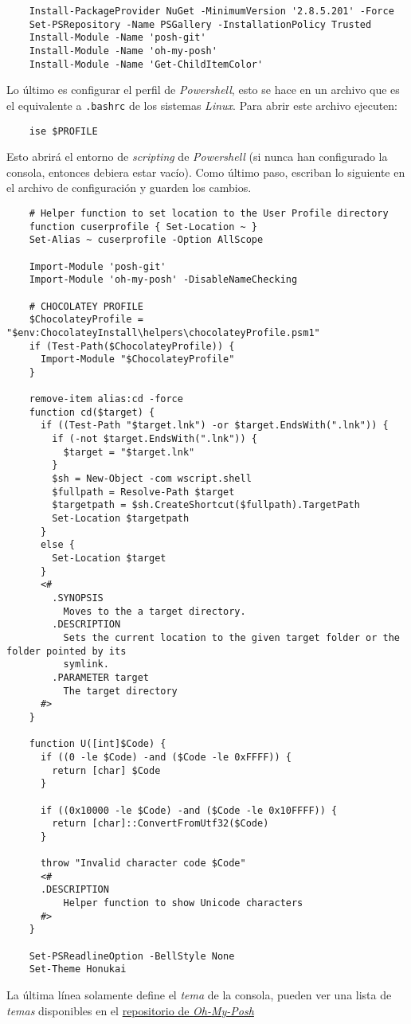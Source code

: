   \begin{verbatim}
    Install-PackageProvider NuGet -MinimumVersion '2.8.5.201' -Force
    Set-PSRepository -Name PSGallery -InstallationPolicy Trusted
    Install-Module -Name 'posh-git'
    Install-Module -Name 'oh-my-posh'
    Install-Module -Name 'Get-ChildItemColor'
  \end{verbatim}

  Lo último es configurar el perfil de \textit{Powershell}, esto se hace en un archivo que
  es el equivalente a \texttt{.bashrc} de los sistemas \textit{Linux}.
  Para abrir este archivo ejecuten:

  \begin{verbatim}
    ise $PROFILE
  \end{verbatim}

  Esto abrirá el entorno de \textit{scripting} de \textit{Powershell} (si nunca han 
  configurado la consola, entonces debiera estar vacío).
  Como último paso, escriban lo siguiente en el archivo de configuración y guarden los 
  cambios.

  \begin{verbatim}
    # Helper function to set location to the User Profile directory
    function cuserprofile { Set-Location ~ }
    Set-Alias ~ cuserprofile -Option AllScope

    Import-Module 'posh-git'
    Import-Module 'oh-my-posh' -DisableNameChecking

    # CHOCOLATEY PROFILE
    $ChocolateyProfile = "$env:ChocolateyInstall\helpers\chocolateyProfile.psm1"
    if (Test-Path($ChocolateyProfile)) {
      Import-Module "$ChocolateyProfile"
    }

    remove-item alias:cd -force
    function cd($target) {
      if ((Test-Path "$target.lnk") -or $target.EndsWith(".lnk")) {
        if (-not $target.EndsWith(".lnk")) {
          $target = "$target.lnk"
        }
        $sh = New-Object -com wscript.shell
        $fullpath = Resolve-Path $target
        $targetpath = $sh.CreateShortcut($fullpath).TargetPath
        Set-Location $targetpath
      }
      else {
        Set-Location $target
      }
      <#
        .SYNOPSIS
          Moves to the a target directory.
        .DESCRIPTION
          Sets the current location to the given target folder or the folder pointed by its
          symlink.
        .PARAMETER target
          The target directory
      #>
    }

    function U([int]$Code) {
      if ((0 -le $Code) -and ($Code -le 0xFFFF)) {
        return [char] $Code
      }
    
      if ((0x10000 -le $Code) -and ($Code -le 0x10FFFF)) {
        return [char]::ConvertFromUtf32($Code)
      }
    
      throw "Invalid character code $Code"
      <#
      .DESCRIPTION
          Helper function to show Unicode characters
      #>
    }

    Set-PSReadlineOption -BellStyle None
    Set-Theme Honukai
  \end{verbatim}

  La última línea solamente define el \textit{tema} de la consola, pueden ver una lista de
  \textit{temas} disponibles en el 
  \href{https://github.com/JanDeDobbeleer/oh-my-posh#themes}{repositorio de \textit{Oh-My-Posh}}
%